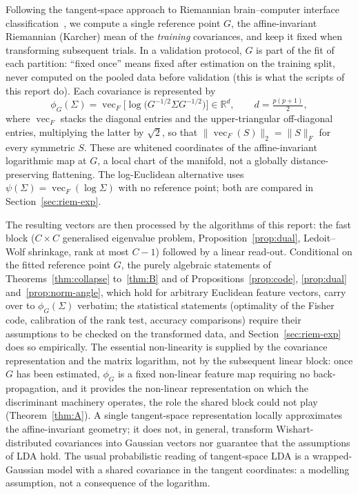 \documentclass[11pt,a4paper]{article}
\theoremstyle{plain}
\theoremstyle{definition}
\theoremstyle{remark}
\newcommand{\R}{\mathbb R}
\newcommand{\vecop}{\operatorname{vec}}
\begin{document}
Following the tangent-space approach to Riemannian brain--computer
interface classification~\cite{barachant2012}, we compute a single reference
point $G$, the affine-invariant Riemannian (Karcher) mean of the
\emph{training} covariances, and keep it fixed when transforming subsequent
trials. In a validation protocol, $G$ is part of the fit of each partition:
``fixed once'' means fixed after estimation on the training split, never
computed on the pooled data before validation (this is what the scripts of
this report do). Each covariance is represented by
\begin{equation}
  \phi_G(\Sigma)=\vecop_F\bigl[\log\bigl(G^{-1/2}\Sigma G^{-1/2}\bigr)\bigr]\in\R^d,\qquad d=\tfrac{p(p+1)}2,
  \label{eq:ts}
\end{equation}
where $\vecop_F$ stacks the diagonal entries and the upper-triangular
off-diagonal entries, multiplying the latter by $\sqrt2$, so that
$\|\vecop_F(S)\|_2=\|S\|_F$ for every symmetric $S$. These are whitened
coordinates of the affine-invariant logarithmic map at $G$, a local chart of
the manifold, not a globally distance-preserving flattening. The
log-Euclidean alternative uses $\psi(\Sigma)=\vecop_F(\log\Sigma)$ with no
reference point; both are compared in Section~\ref{sec:riem-exp}.

The resulting vectors are then processed by the algorithms of this report:
the fast block ($C\times C$ generalised eigenvalue problem,
Proposition~\ref{prop:dual}, Ledoit--Wolf shrinkage, rank at most $C-1$)
followed by a linear read-out. Conditional on the fitted reference point
$G$, the purely algebraic statements of Theorems~\ref{thm:collapse}
to~\ref{thm:B} and of Propositions~\ref{prop:code}, \ref{prop:dual}
and~\ref{prop:norm-angle}, which hold for arbitrary Euclidean feature
vectors, carry over to $\phi_G(\Sigma)$ verbatim; the statistical statements
(optimality of the Fisher code, calibration of the rank test, accuracy
comparisons) require their assumptions to be checked on the transformed
data, and Section~\ref{sec:riem-exp} does so empirically. The essential
non-linearity is supplied by the covariance representation and the matrix
logarithm, not by the subsequent linear block: once $G$ has been estimated,
$\phi_G$ is a fixed non-linear feature map requiring no back-propagation,
and it provides the non-linear representation on which the discriminant
machinery operates, the role the shared block could not play
(Theorem~\ref{thm:A}). A single tangent-space representation locally
approximates the affine-invariant geometry; it does not, in general,
transform Wishart-distributed covariances into Gaussian vectors nor
guarantee that the assumptions of LDA hold. The usual probabilistic reading
of tangent-space LDA is a wrapped-Gaussian model with a shared covariance in
the tangent coordinates: a modelling assumption, not a consequence of the
logarithm.
\end{document}

